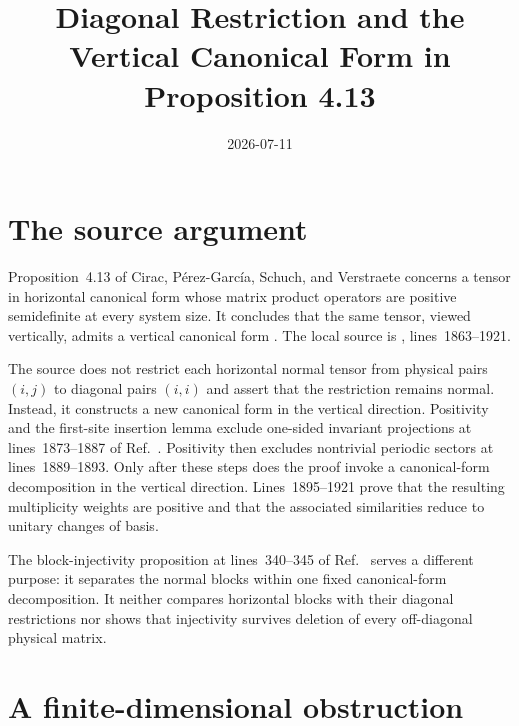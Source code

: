 \documentclass{article}
\title{Diagonal Restriction and the Vertical Canonical Form in Proposition 4.13}
\author{}
\date{2026-07-11}
\begin{document}
\maketitle
{}

\section{The source argument}

Proposition~4.13 of Cirac, P\'erez-Garc\'ia, Schuch, and Verstraete concerns a
tensor in horizontal canonical form whose matrix product operators are positive
semidefinite at every system size. It concludes that the same tensor, viewed
vertically, admits a vertical canonical form
\cite[Proposition~4.13]{Cirac2016MPDO_arXiv}. The local source is
, lines~1863--1921.

The source does not restrict each horizontal normal tensor from physical pairs
$(i,j)$ to diagonal pairs $(i,i)$ and assert that the restriction remains
normal. Instead, it constructs a new canonical form in the vertical direction.
Positivity and the first-site insertion lemma exclude one-sided invariant
projections at lines~1873--1887 of
Ref.~\cite{Cirac2016MPDO_arXiv}. Positivity then excludes nontrivial periodic
sectors at lines~1889--1893. Only after these steps does the proof invoke a
canonical-form decomposition in the vertical direction. Lines~1895--1921 prove
that the resulting multiplicity weights are positive and that the associated
similarities reduce to unitary changes of basis.

The block-injectivity proposition at lines~340--345 of
Ref.~\cite{Cirac2016MPDO_arXiv} serves a different purpose: it separates the
normal blocks within one fixed canonical-form decomposition. It neither
compares horizontal blocks with their diagonal restrictions nor shows that
injectivity survives deletion of every off-diagonal physical matrix.

\section{A finite-dimensional obstruction}
\end{document}
